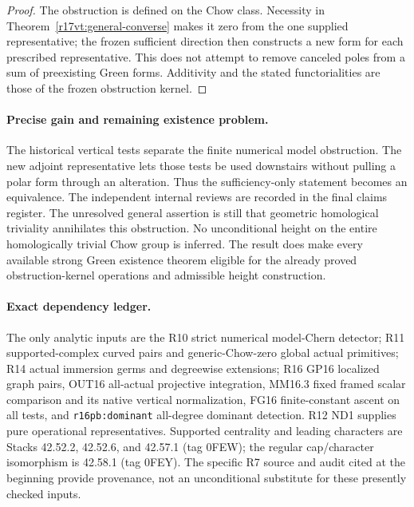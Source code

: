 \begin{proof}
The obstruction is defined on the Chow class. Necessity in
Theorem~\ref{r17vt:general-converse} makes it zero from the
one supplied representative; the frozen sufficient direction
then constructs a new form for each prescribed representative.
This does not attempt to remove canceled poles from a sum
of preexisting Green forms. Additivity and the stated
functorialities are those of the frozen obstruction kernel.
\end{proof}

\paragraph{Precise gain and remaining existence problem.}
The historical vertical tests separate the finite numerical
model obstruction. The new adjoint representative lets those
tests be used downstairs without pulling a polar form through
an alteration. Thus the sufficiency-only statement becomes an
equivalence. The independent internal reviews are recorded in the final claims register.
The unresolved general assertion is still that geometric
homological triviality annihilates this obstruction. No
unconditional height on the entire homologically trivial Chow
group is inferred. The result does make every available strong
Green existence theorem eligible for the already proved
obstruction-kernel operations and admissible height construction.

\paragraph{Exact dependency ledger.}
The only analytic inputs are the R10 strict numerical
model-Chern detector; R11 supported-complex curved pairs and
generic-Chow-zero global actual primitives; R14 actual immersion
germs and degreewise extensions; R16 GP16 localized graph
pairs, OUT16 all-actual projective integration, MM16.3 fixed
framed scalar comparison and its native vertical normalization,
FG16 finite-constant ascent on all tests, and
\texttt{r16pb:dominant} all-degree dominant detection.
R12 ND1 supplies pure operational representatives. Supported
centrality and leading characters are Stacks 42.52.2,
42.52.6, and 42.57.1 (tag 0FEW); the regular cap/character
isomorphism is 42.58.1 (tag 0FEY). The specific R7 source
and audit cited at the beginning provide provenance, not an
unconditional substitute for these presently checked inputs.
